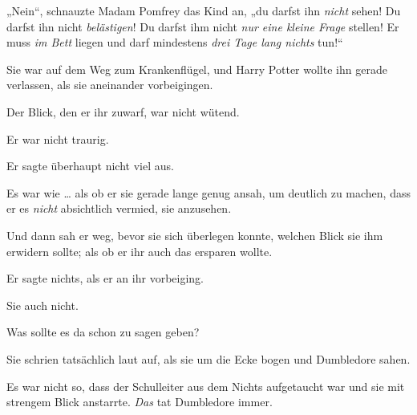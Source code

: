 
„Nein“, schnauzte Madam Pomfrey das Kind an, „du darfst ihn \emph{nicht} sehen! Du darfst ihn nicht \emph{belästigen}! Du darfst ihm nicht \emph{nur eine kleine Frage} stellen! Er muss \emph{im Bett} liegen und darf mindestens \emph{drei Tage lang nichts} tun!“


Sie war auf dem Weg zum Krankenflügel, und Harry Potter wollte ihn gerade verlassen, als sie aneinander vorbeigingen.

Der Blick, den er ihr zuwarf, war nicht wütend.

Er war nicht traurig.

Er sagte überhaupt nicht viel aus.

Es war wie … als ob er sie gerade lange genug ansah, um deutlich zu machen, dass er es \emph{nicht} absichtlich vermied, sie anzusehen.

Und dann sah er weg, bevor sie sich überlegen konnte, welchen Blick sie ihm erwidern sollte; als ob er ihr auch das ersparen wollte.

Er sagte nichts, als er an ihr vorbeiging.

Sie auch nicht.

Was sollte es da schon zu sagen geben?


Sie schrien tatsächlich laut auf, als sie um die Ecke bogen und Dumbledore sahen.

Es war nicht so, dass der Schulleiter aus dem Nichts aufgetaucht war und sie mit strengem Blick anstarrte. \emph{Das} tat Dumbledore immer.


